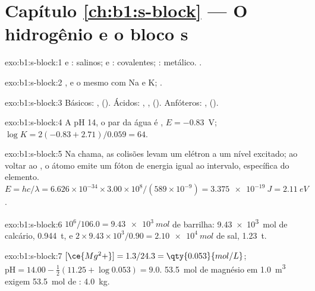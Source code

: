 \section*{Capítulo \ref{ch:b1:s-block} --- O hidrogênio e o bloco s}

\begin{solution}{exo:b1:s-block:1}
 e : salinos;  e : covalentes;
: metálico. .
\end{solution}

\begin{solution}{exo:b1:s-block:2}
, e o mesmo com Na e K;
.
\end{solution}

\begin{solution}{exo:b1:s-block:3}
Básicos: ,  (). Ácidos:
, ,  (). Anfóteros:
,  ().
\end{solution}

\begin{solution}{exo:b1:s-block:4}
A pH 14, o par da água é , $E = -0.83$~V;
$\log K = 2(-0.83 + 2.71)/0.059 = 64$.
\end{solution}

\begin{solution}{exo:b1:s-block:5}
Na chama, as colisões levam um elétron a um nível excitado; ao voltar ao
, o átomo emite um fóton de energia igual ao
intervalo, específica do elemento. $E = hc/\lambda = 6.626 \times 10^{-34} \times
3.00 \times 10^8/(589 \times 10^{-9}) = \qty{3.375e-19}{J} = \qty{2.11}{eV}$.
\end{solution}

\begin{solution}{exo:b1:s-block:6}
$10^6/106.0 = \qty{9.43e3}{mol}$ de barrilha: \qty{9.43e3}{mol} de
calcário, \qty{0.944}{t}, e $2 \times 9.43 \times 10^3/0.90 =
\qty{2.10e4}{mol}$ de sal, \qty{1.23}{t}.
\end{solution}

\begin{solution}{exo:b1:s-block:7}
$[\ce{Mg^2+}] = 1.3/24.3 = \qty{0.053}{mol/L}$; $\mathrm{pH} = 14.00 -
\frac12(11.25 + \log 0.053) = 9.0$. \qty{53.5}{mol} de magnésio em
\qty{1.0}{m^3} exigem \qty{53.5}{mol} de : \qty{4.0}{kg}.
\end{solution}

